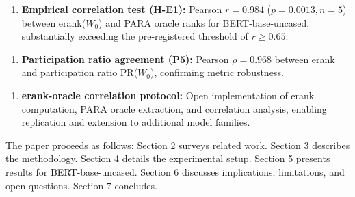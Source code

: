 \begin{enumerate}
\item \textbf{Empirical correlation test (H-E1):} Pearson $r = 0.984$ ($p = 0.0013, n = 5$) between erank($W_0$) and PARA oracle ranks for BERT-base-uncased, substantially exceeding the pre-registered threshold of $r \geq 0.65$.
\end{enumerate}

\begin{enumerate}
\item \textbf{Participation ratio agreement (P5):} Pearson $\rho = 0.968$ between erank and participation ratio PR($W_0$), confirming metric robustness.
\end{enumerate}

\begin{enumerate}
\item \textbf{erank-oracle correlation protocol:} Open implementation of erank computation, PARA oracle extraction, and correlation analysis, enabling replication and extension to additional model families.
\end{enumerate}

The paper proceeds as follows: Section 2 surveys related work. Section 3 describes the methodology. Section 4 details the experimental setup. Section 5 presents results for BERT-base-uncased. Section 6 discusses implications, limitations, and open questions. Section 7 concludes.

